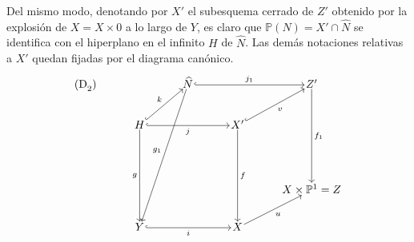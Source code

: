 Del mismo modo, denotando por $X'$ el subesquema cerrado de $Z'$ obtenido por la explosión de $X=X\times0$ a lo largo de $Y$, es claro que $\mathbb P(N)=X'\cap\widehat N$ se identifica con el hiperplano en el infinito $H$ de $\widehat N$. Las demás notaciones relativas a $X'$ quedan fijadas por el diagrama canónico.
\[
\begin{tikzcd}[column sep=3.2em,row sep=2.4em,cells={nodes={inner sep=1pt}}]
\text{(D}_2\text{)}\arrow[from=1-3,to=5-2,"g_1"']
& & \widehat N \arrow[rr,hook,"j_1"] & & Z' \arrow[ddd,"f_1"] \\
& H \arrow[ur,hook,"k"] \arrow[rr,hook,"j"'] \arrow[ddd,"g"'] & &
X' \arrow[ur,hook,"v"'] \arrow[ddd,"f"] & \\
& & & & \\
& & & & X\times\mathbb P^1=Z \\
& Y \arrow[rr,hook,"i"'] & & X \arrow[ur,"u"'] &
\end{tikzcd}
\]
